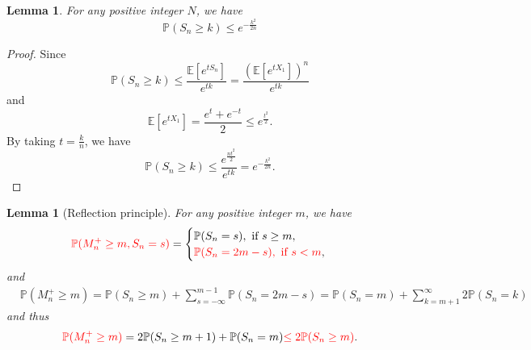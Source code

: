 \documentclass[11pt]{article}
\newtheorem{lemma}[theorem]{Lemma}
\theoremstyle{definition}
\begin{document}
\begin{lemma}\label{lm3}
For any positive integer $N$, we have 
\[
\mathbb{P}\left(S_n\ge k\right)\le e^{-\frac{k^2}{2n}}
\]
\end{lemma}
\begin{proof}
  Since $$\mathbb{P}\left(S_n\ge k\right)\le \frac{\mathbb{E}[e^{tS_n}]}{e^{tk}}=\frac{\left(\mathbb{E}[e^{tX_1}]\right)^n}{e^{tk}}$$
and 
\[
\mathbb{E}[e^{tX_1}]=\frac{e^t+e^{-t}}{2}\le e^{\frac{t^2}{2}}.
\]
By taking $t=\frac{k}{n}$, we have
\[
\mathbb{P}\left(S_n\ge k\right)\le \frac{e^{\frac{nt^2}{2}}}{e^{tk}}=e^{-\frac{k^2}{2n}}.
\]
\end{proof}
\begin{lemma}[Reflection principle]
  For any positive integer $m$, we have
\begin{equation*}
  \begin{aligned}
     & {\color{red}\mathbb{P}(M^+_n\ge m, S_n=s)}=\begin{cases}
\mathbb{P}(S_n=s), \text{ if $s\ge m$},\\
{\color{red}\mathbb{P}(S_n=2m-s), \text{ if $s< m$}},
\end{cases}
  \end{aligned}
\end{equation*}
and 
\begin{equation*}
  \begin{aligned}
     & \mathbb{P}(M_n^+\ge m)=\mathbb{P}(S_n\ge m) +\sum^{m-1}_{s=-\infty} \mathbb{P}(S_n=2m-s)=\mathbb{P}(S_n=m)+\sum^\infty_{k=m+1} 2\mathbb{P}(S_n=k)
  \end{aligned}
\end{equation*}
and thus
\[
{\color{red}\mathbb{P}(M_n^+\ge m)}=2\mathbb{P}(S_n\ge m+1)+\mathbb{P}(S_n=m){\color{red}\le 2\mathbb{P}(S_n\ge m)}.
\]
\end{lemma}
\end{document}
